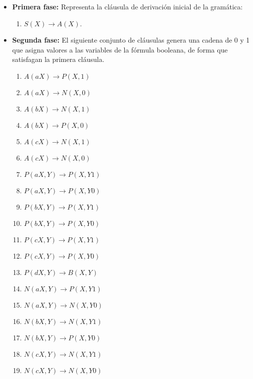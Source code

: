 \begin{itemize}
    \item \textbf{Primera fase:} Representa la cláusula de derivación inicial de la gramática:
          \begin{enumerate}
              \item $S(X)\to A(X)$.
          \end{enumerate}
          
    \item \textbf{Segunda fase:} El siguiente conjunto de cláusulas genera una cadena de 0 y 1 que asigna valores a las
          variables de la fórmula booleana, de forma que satisfagan la primera cláusula.
          \begin{multicols}{2}
              \begin{enumerate}[start=2]
                  \item $A(aX)\to P(X,1)$
                  \item $A(aX)\to N(X,0)$
                  \item $A(bX)\to N(X,1)$
                  \item $A(bX)\to P(X,0)$
                  \item $A(cX)\to N(X,1)$
                  \item $A(cX)\to N(X,0)$
                        
                  \item $P(aX,Y)\to P(X,Y1)$
                  \item $P(aX,Y)\to P(X,Y0)$
                  \item $P(bX,Y)\to P(X,Y1)$
                  \item $P(bX,Y)\to P(X,Y0)$
                  \item $P(cX,Y)\to P(X,Y1)$
                  \item $P(cX,Y)\to P(X,Y0)$
                  \item $P(dX,Y)\to B(X,Y)$
                        
                  \item $N(aX,Y)\to P(X,Y1)$
                  \item $N(aX,Y)\to N(X,Y0)$
                  \item $N(bX,Y)\to N(X,Y1)$
                  \item $N(bX,Y)\to P(X,Y0)$
                  \item $N(cX,Y)\to N(X,Y1)$
                  \item $N(cX,Y)\to N(X,Y0)$
              \end{enumerate}
          \end{multicols}
          

\end{itemize}
